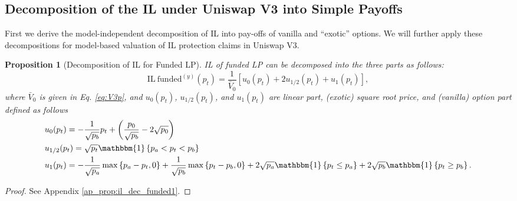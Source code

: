 \documentclass[pdftex,11pt,a4paper] {article}
\newtheorem{proposition}{Proposition}[section]
\begin{document}
\subsection{Decomposition of the IL under Uniswap V3 into Simple Payoffs}

\label{sec:ild}

First we derive the model-independent decomposition of IL into pay-offs of
vanilla and ``exotic'' options. We will further apply these decompositions
for model-based valuation of IL protection claims in Uniswap V3.

\begin{proposition}[Decomposition of IL for Funded LP]
\label{prop:il_dec_funded1} IL of funded LP can be decomposed into the three
parts as follows:
\begin{equation}  \label{eq:il_dec_funded1}
\mathrm{IL \ funded}^{(y)}(p_{t}) = \frac{1}{\bar{V}_{0}}\left[u_{0}(p_{t}) + 2u_{1/2}(p_{t}) + u_{1}(p_{t})\right],
\end{equation}
where $\bar{V}_{0}$ is given in Eq. \eqref{eq:V3p}, and $u_{0}(p_{t})$, $u_{1/2}(p_{t})$, and $u_{1}(p_{t})$ are linear part,
(exotic) square root price, and (vanilla) option part defined as follows
\begin{equation}  \label{eq:il_dec_funded2}
\begin{split}
& u_{0}(p_{t}) = - \frac{1}{\sqrt{p_{b}}} p_{t} + \left(\frac{p_{0}}{\sqrt{%
p_{b}}}-2\sqrt{p_{0}}\right) \\
& u_{1/2}(p_{t}) = \sqrt{p_{t}} \mathbbm{1}\left\{ p_{a} < p_{t} <
p_{b}\right\} \\
& u_{1}(p_{t}) = -\frac{1}{\sqrt{p_{a}}} \max\left\{ p_{a}-p_{t}, 0\right\}
+ \frac{1}{\sqrt{p_{b}}} \max\left\{ p_{t}-p_{b}, 0\right\} + 2\sqrt{p_{a}} %
\mathbbm{1}\left\{p_{t}\leq p_{a}\right\} + 2\sqrt{p_{b}}\mathbbm{1}%
\left\{p_{t} \geq p_{b}\right\}.
\end{split}%
\end{equation}
\end{proposition}

\begin{proof}
See Appendix \ref{ap_prop:il_dec_funded1}.
\end{proof}
\end{document}
